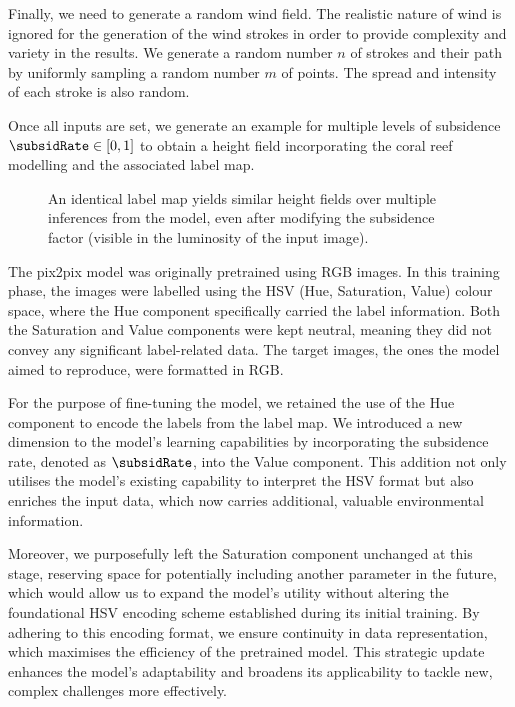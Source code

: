 Finally, we need to generate a random wind field. The realistic nature of wind is ignored for the generation of the wind strokes in order to provide complexity and variety in the results.
We generate a random number $n$ of strokes and their path by uniformly sampling a random number $m$ of points. The spread and intensity of each stroke is also random.

Once all inputs are set, we generate an example for multiple levels of subsidence $\subsidRate \in [0, 1]$ to obtain a height field incorporating the coral reef modelling and the associated label map.

\begin{figure}
\caption{An identical label map yields similar height fields over multiple inferences from the model, even after modifying the subsidence factor (visible in the luminosity of the input image).}
\label{fig:coral-island-results-subsidence}
\end{figure}

The pix2pix model was originally pretrained using RGB images. In this training phase, the images were labelled using the HSV (Hue, Saturation, Value) colour space, where the Hue component specifically carried the label information. Both the Saturation and Value components were kept neutral, meaning they did not convey any significant label-related data. The target images, the ones the model aimed to reproduce, were formatted in RGB.

For the purpose of fine-tuning the model, we retained the use of the Hue component to encode the labels from the label map. We introduced a new dimension to the model's learning capabilities by incorporating the subsidence rate, denoted as $\subsidRate$, into the Value component. This addition not only utilises the model's existing capability to interpret the HSV format but also enriches the input data, which now carries additional, valuable environmental information.

Moreover, we purposefully left the Saturation component unchanged at this stage, reserving space for potentially including another parameter in the future, which would allow us to expand the model's utility without altering the foundational HSV encoding scheme established during its initial training. By adhering to this encoding format, we ensure continuity in data representation, which maximises the efficiency of the pretrained model. This strategic update enhances the model's adaptability and broadens its applicability to tackle new, complex challenges more effectively.

